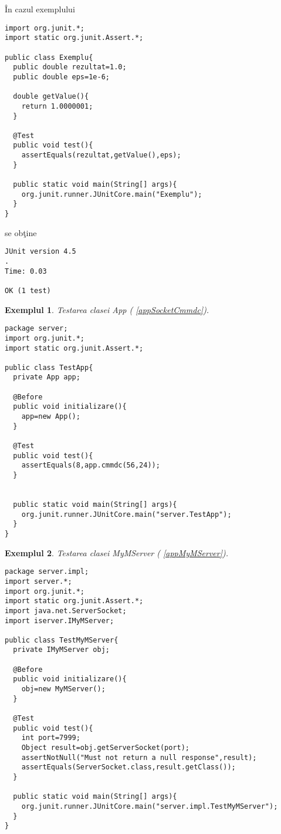 \documentclass[12pt]{book}
\newtheorem{exemplu}{Exemplul}[section]
\begin{document}
\^{I}n cazul exemplului  
\scriptsize
\lstset{language=Java}
\begin{lstlisting}
import org.junit.*;
import static org.junit.Assert.*;

public class Exemplu{
  public double rezultat=1.0;
  public double eps=1e-6;
  
  double getValue(){
    return 1.0000001;
  }
  
  @Test 
  public void test(){   
    assertEquals(rezultat,getValue(),eps);
  }
  
  public static void main(String[] args){
    org.junit.runner.JUnitCore.main("Exemplu");
  }
}
\end{lstlisting}
\normalsize
se ob\c{t}ine
\scriptsize
\begin{verbatim}
JUnit version 4.5
.
Time: 0.03

OK (1 test)
\end{verbatim}
\normalsize

\begin{exemplu} Testarea clasei App ( \ref{appSocketCmmdc}).
\end{exemplu}

\scriptsize
\lstset{language=Java}
\begin{lstlisting}
package server;
import org.junit.*;
import static org.junit.Assert.*;

public class TestApp{
  private App app;
  
  @Before
  public void initializare(){
    app=new App(); 
  }
  
  @Test 
  public void test(){  
    assertEquals(8,app.cmmdc(56,24));
  }
  
  
  public static void main(String[] args){
    org.junit.runner.JUnitCore.main("server.TestApp");
  }
}
\end{lstlisting}
\normalsize

\begin{exemplu} Testarea clasei MyMServer ( \ref{appMyMServer}).
\end{exemplu}

\scriptsize
\lstset{language=Java}
\begin{lstlisting}
package server.impl;
import server.*;
import org.junit.*;
import static org.junit.Assert.*;
import java.net.ServerSocket;
import iserver.IMyMServer;

public class TestMyMServer{
  private IMyMServer obj;
  
  @Before
  public void initializare(){
    obj=new MyMServer(); 
  }
  
  @Test 
  public void test(){ 
    int port=7999;  
    Object result=obj.getServerSocket(port);
    assertNotNull("Must not return a null response",result);
    assertEquals(ServerSocket.class,result.getClass());
  }
  
  public static void main(String[] args){
    org.junit.runner.JUnitCore.main("server.impl.TestMyMServer");
  }
}
\end{lstlisting}
\normalsize
\end{document}
